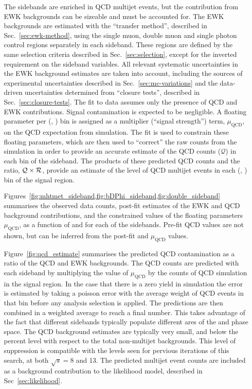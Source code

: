 The sidebands are enriched in QCD multijet events, but the contribution
from EWK backgrounds can be sizeable and must be accounted for. The
EWK backgrounds are estimated with the ``transfer method'', described
in Sec.~\ref{sec:ewk-method}, using the single muon, double muon and
single photon control regions separately in each sideband. These regions are defined by the same
selection criteria described in Sec.~\ref{sec:selection}, except for
the inverted requirement on the sideband variables. All relevant systematic
uncertainties in the EWK background estimates are taken into account,
including the sources of experimental uncertainties described in
Sec.~\ref{sec:mc-variations} and the data-driven uncertainties
determined from ``closure tests'', described in
Sec.~\ref{sec:closure-tests}. The fit to data assumes only the
presence of QCD and EWK contributions. Signal contamination is
expected to be negligible. A floating parameter per (\njet, \scalht)
bin is assigned as a multiplier (``signal strength'') term,
$\mu_{\textrm{QCD}}$, on the QCD expectation from simulation. The fit
is used to constrain these floating parameters, which are then used to
``correct'' the raw counts from the simulation in order to provide an
accurate estimate of the QCD counts ($\mathcal{Q}$) in each bin of the
sideband. The products of these predicted QCD counts and the ratio,
$\mathcal{Q} \times \mbox{$\mathcal{R}$}$, provide an estimate of the level of QCD
multijet events in each (\njet, \scalht) bin of the signal region.

Figures~\ref{fig:mhtmet_sideband,fig:bDPhi_sideband,fig:double_sideband}
summarises the observed data counts, post-fit estimates of the EWK and
QCD background contributions, and the constrained values of the
floating parameters $\mu_{\textrm{QCD}}$, as a function of \njet and
\scalht for each of the sidebands. Pre-fit QCD values are not shown,
but can be inferred from the post-fit and $\mu_{\textrm{QCD}}$ values. 

Figure~\ref{fig:qcd_estimate} summarises the predicted QCD
contamination as a ratio of the QCD and EWK backgrounds. The QCD
counts are predicted with each sideband by multiplying the value of
$\mu_{\textrm{QCD}}$ by the counts of QCD simulation in the signal
region. In the case that there is a zero yield in simulation the error
is estimated by taking a poisson error with the average weight of QCD
events in that bin before any analysis selection is applied. The
predictions are then combined in a weighted average to reach a final
number. This takes advantage of the fact that different sidebands
typically populate different ares of the \njet and \scalht phase
space.  The QCD background estimates are typically very small, and
below the percent level with respect to the total non-multijet
backgrounds. This level of suppression is compatible with the levels
seen for pervious iterations of this search, at both $\sqrt{s} = 8$
and 13\TeV. The predicted multijet event counts are included as a
background contribution to the likelihood model, described in
Sec~\ref{sec:likelihood}.

